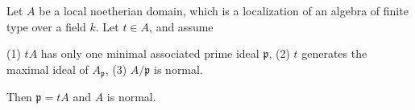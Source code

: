 Let $A$ be a local noetherian domain, which is a localization of an algebra of finite type over a field $k$. Let $t \in A$, and assume

(1) $tA$ has only one minimal associated prime ideal $\mathfrak{p}$,
(2) $t$ generates the maximal ideal of $A_{\mathfrak{p}}$,
(3) $A/\mathfrak{p}$ is normal.

Then $\mathfrak{p} = tA$ and $A$ is normal.
